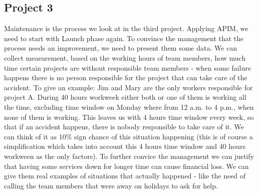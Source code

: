 \subsection*{Project 3}

Maintenance is the process we look at in the third project. Applying APIM, we need to start with Launch phase again. To convince the management that the process needs an improvement, we need to present them some data. We can collect measurement, based on the working hours of team members, how much time certain projects are without responsible team members - when some failure happens there is no person responsible for the project that can take care of the accident. To give an example: Jim and Mary are the only workers responsible for project A. During 40 hours workweek either both or one of them is working all the time, excluding time window on Monday where from 12 a.m. to 4 p.m., when none of them is working. This leaves us with 4 hours time window every week, so that if an accident happens, there is nobody responsible to take care of it. We can think of it as 10\% sign chance of this situation happening (this is of course a simplification which takes into account this 4 hours time window and 40 hours workween as the only factors). To further convice the management we can justify that having some services down for longer time can cause financial loss. We can give them real examples of situations that actually happened - like the need of calling the team members that were away on holidays to ask for help.

